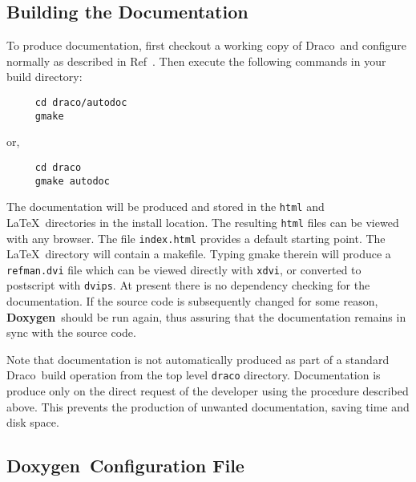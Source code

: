 \documentclass[11pt]{nmemo}
\newcommand{\draco}{{\normalfont\sffamily Draco}}
\newcommand{\doxy}{{\normalfont\bfseries Doxygen}}
\begin{document}
\subsection{Building the Documentation}

To produce documentation, first checkout a working copy of \draco\ 
and configure normally as described in  Ref~\cite{draco-build}.
Then execute the following commands in your build directory:
\begin{verbatim} 
     cd draco/autodoc
     gmake 
\end{verbatim}
or,
\begin{verbatim} 
     cd draco
     gmake autodoc
\end{verbatim}
The documentation will be produced and stored in the
\texttt{html} and \LaTeX\ directories in the install location.
The resulting \texttt{html} files can be viewed with any browser. The
file \texttt{index.html} provides a default starting point. The \LaTeX\
directory will contain a makefile. Typing gmake therein will produce 
a \texttt{refman.dvi} file which can be viewed directly with \texttt{xdvi},
or converted to postscript with \texttt{dvips}. At present there
is no dependency checking for the documentation.
If the source code is subsequently changed for some reason,
\doxy\ should be run again, thus assuring that the documentation 
remains in sync with the source code.

Note that documentation is not automatically produced as part of 
a standard \draco\ build operation from the top level \texttt{draco} 
directory. Documentation is produce only on the direct request 
of the developer using the procedure described above. This prevents
the production of unwanted documentation, saving time and disk space.


\subsection{\doxy\ Configuration File}
\label{sec:config}
\end{document}
